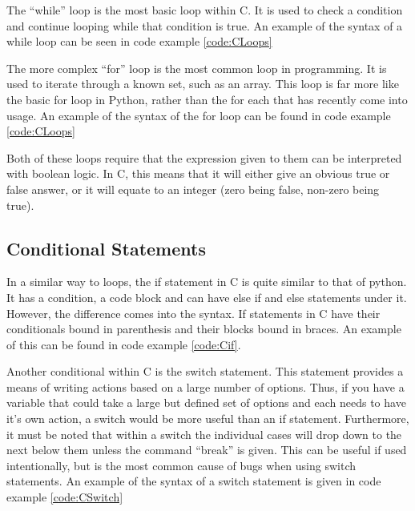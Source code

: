 \documentclass[a4paper,11pt]{report}
\begin{document}
			The ``while'' loop is the most basic loop within C. 
			It is used to check a condition and continue looping while that condition is true. 
			An example of the syntax of a while loop can be seen in code example \ref{code:CLoops}

			The more complex ``for'' loop is the most common loop in programming. 
			It is used to iterate through a known set, such as an array. 
			This loop is far more like the basic for loop in Python, rather than the for each that has recently come into usage. 
			An example of the syntax of the for loop can be found in code example \ref{code:CLoops}
			
			Both of these loops require that the expression given to them can be interpreted with boolean logic. 
			In C, this means that it will either give an obvious true or false answer, or it will equate to an integer (zero being false, non-zero being true).

			\begin{code}
				C}]{./CLoops.c}
				\caption{Examples of Basic C Loops}
				\label{code:CLoops}
			\end{code}
		\subsection{Conditional Statements}
			In a similar way to loops, the if statement in C is quite similar to that of python. 
			It has a condition, a code block and can have else if and else statements under it. 
			However, the difference comes into the syntax. 
			If statements in C have their conditionals bound in parenthesis and their blocks bound in braces. 
			An example of this can be found in code example \ref{code:Cif}.

			\begin{code}
				C}]{./if.c}
				\caption{Example of the C if statement}
				\label{code:Cif}
			\end{code}

			Another conditional within C is the switch statement. 
			This statement provides a means of writing actions based on a large number of options. 
			Thus, if you have a variable that could take a large but defined set of options and each needs to have it's own action, a switch would be more useful than an if statement. 
			Furthermore, it must be noted that within a switch the individual cases will drop down to the next below them unless the command ``break'' is given. 
			This can be useful if used intentionally, but is the most common cause of bugs when using switch statements. 
			An example of the syntax of a switch statement is given in code example \ref{code:CSwitch}
\end{document}
